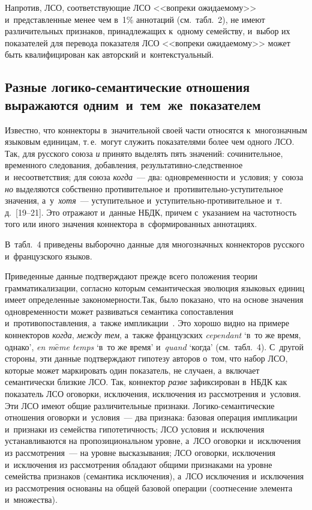 \begin{multicols}{2}
  
  Напротив, ЛСО, соответствующие ЛСО <<вопреки ожидаемому>> 
и~представленные менее чем в~1\% аннотаций (см.\ табл.~2), не имеют 
различительных признаков, принадлежащих к~одному семейству, и~выбор их 
показателей для перевода показателя ЛСО <<вопреки ожидаемому>> может 
быть квалифицирован как авторский и~контекстуальный.
  
\subsection{Разные логико-семантические отношения выражаются одним~и~тем~же~показателем}

  Известно, что коннекторы в~значительной своей части относятся 
к~многозначным языковым единицам, т.\,е.\ могут служить показателями более 
чем одного ЛСО. Так, для русского союза \textit{и} принято выделять пять 
значений: сочинительное, временного следования, добавления,  
ре\-зуль\-та\-тив\-но-след\-ст\-вен\-ное и~несоответствия; для союза 
\textit{когда}~--- два: одновременности и~условия; у~союза \textit{но} 
выделяются собственно противительное  
и~про\-ти\-ви\-тель\-но-усту\-пи\-тель\-ное значения, а~у~\textit{хотя}~--- 
уступительное и~усту\-пи\-тель\-но-про\-ти\-ви\-тель\-ное и~т.\,д.~[19--21]. Это 
отражают и~данные НБДК, причем с~указанием на частотность того или иного 
значения коннектора в~сформированных аннотациях. 

В~табл.~4 приведены 
выборочно данные для многозначных коннекторов русского и~французского 
языков.
  

  
  Приведенные данные подтверждают прежде всего положения теории 
грамматикализации, согласно которым семантическая эволюция языковых 
единиц имеет определенные закономерности.\linebreak Так, было показано, что на основе 
значения одновременности может развиваться семантика сопоставления и~противопоставления, а~также импликации~\cite{22-in}. Это хорошо видно на 
примере \mbox{коннекторов} \textit{когда}, \textit{между тем}, а~также французских 
\textit{cependant} `в~то же время, однако', \textit{en m$\hat{\mbox{e}}$me temps} 
`в~то же время' и~\textit{quand} `когда' (см.\ табл.~4). С~другой стороны, эти 
данные подтверждают гипотезу авторов о~том, что набор ЛСО, которые может 
маркировать один показатель, не случаен, а~включает семантически близкие 
ЛСО. Так, коннектор \textit{разве} зафиксирован в~НБДК как показатель ЛСО 
оговорки, исключения, исключения из рассмотрения и~условия. Эти ЛСО имеют 
общие различительные признаки. Ло\-ги\-ко-се\-ман\-ти\-че\-ские отношения оговорки и~условия~--- два признака: 
базовая операция импликации и~признаки из семейства гипотетичность; ЛСО 
условия и~исключения устанавливаются на пропозициональном уровне, а~ЛСО 
оговорки и~исключения из рас\-смот\-ре\-ния~--- на уров\-не вы\-ска\-зы\-ва\-ния; ЛСО 
оговорки, исключения и~исключения из рас\-смот\-ре\-ния обладают общими 
признаками на уровне семейства признаков (семантика исключения), а~ЛСО 
исключения и~исключения из рас\-смот\-ре\-ния осно\-ва\-ны на общей базовой 
операции (соотнесение элемента и~множества).
  

\end{multicols}
